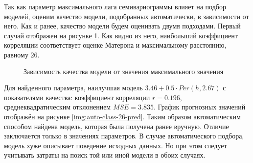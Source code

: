 Так как параметр максимального лага семивариограммы влияет на подбор моделей, оценим качество модели, подобранных автоматически, в зависимости от него. Как и ранее, качество модели будем оценивать двумя подходами. Первый случай отображен на рисунке \ref{img:auto-corr-cutoff}. Как видно из него, наибольший коэффициент корреляции соответствует оценке Матерона и максимальному расстоянию, равному $ 26 $.
\begin{figure}[ht]
\caption{Зависимость качества модели от значения максимального значения}
\label{img:auto-corr-cutoff}
\end{figure}
Для найденного параметра, наилучшая модель $ 3.46 + 0.5 \cdot Per(h, 2.67) $ с показателями качества: коэффициент корреляции $ r = 0.196 $, среднеквадратическим отклонением $ MSE = 3.835 $. График прогнозных значений отображён на рисунке \ref{img:auto-class-26-pred}. Таким образом автоматическим способом найдена модель, которая была получена ранее вручную. Отличие заключается только в значениях параметров. В случае автоматического подбора, модель хуже описывает поведение исходных данных. Но при этом следует учитывать затраты на поиск той или иной модели в обоих случаях.

